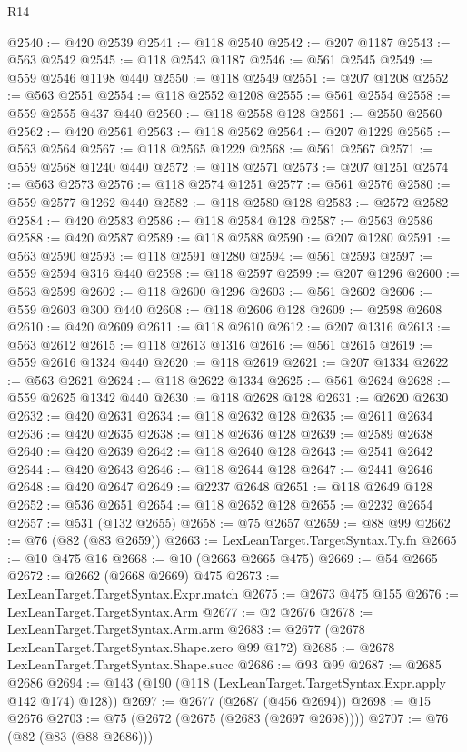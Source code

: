 \begin{lexlean}{R14}
\begin{coremodule}
@2540 := @420 @2539
@2541 := @118 @2540
@2542 := @207 @1187
@2543 := @563 @2542
@2545 := @118 @2543 @1187
@2546 := @561 @2545
@2549 := @559 @2546 @1198 @440
@2550 := @118 @2549
@2551 := @207 @1208
@2552 := @563 @2551
@2554 := @118 @2552 @1208
@2555 := @561 @2554
@2558 := @559 @2555 @437 @440
@2560 := @118 @2558 @128
@2561 := @2550 @2560
@2562 := @420 @2561
@2563 := @118 @2562
@2564 := @207 @1229
@2565 := @563 @2564
@2567 := @118 @2565 @1229
@2568 := @561 @2567
@2571 := @559 @2568 @1240 @440
@2572 := @118 @2571
@2573 := @207 @1251
@2574 := @563 @2573
@2576 := @118 @2574 @1251
@2577 := @561 @2576
@2580 := @559 @2577 @1262 @440
@2582 := @118 @2580 @128
@2583 := @2572 @2582
@2584 := @420 @2583
@2586 := @118 @2584 @128
@2587 := @2563 @2586
@2588 := @420 @2587
@2589 := @118 @2588
@2590 := @207 @1280
@2591 := @563 @2590
@2593 := @118 @2591 @1280
@2594 := @561 @2593
@2597 := @559 @2594 @316 @440
@2598 := @118 @2597
@2599 := @207 @1296
@2600 := @563 @2599
@2602 := @118 @2600 @1296
@2603 := @561 @2602
@2606 := @559 @2603 @300 @440
@2608 := @118 @2606 @128
@2609 := @2598 @2608
@2610 := @420 @2609
@2611 := @118 @2610
@2612 := @207 @1316
@2613 := @563 @2612
@2615 := @118 @2613 @1316
@2616 := @561 @2615
@2619 := @559 @2616 @1324 @440
@2620 := @118 @2619
@2621 := @207 @1334
@2622 := @563 @2621
@2624 := @118 @2622 @1334
@2625 := @561 @2624
@2628 := @559 @2625 @1342 @440
@2630 := @118 @2628 @128
@2631 := @2620 @2630
@2632 := @420 @2631
@2634 := @118 @2632 @128
@2635 := @2611 @2634
@2636 := @420 @2635
@2638 := @118 @2636 @128
@2639 := @2589 @2638
@2640 := @420 @2639
@2642 := @118 @2640 @128
@2643 := @2541 @2642
@2644 := @420 @2643
@2646 := @118 @2644 @128
@2647 := @2441 @2646
@2648 := @420 @2647
@2649 := @2237 @2648
@2651 := @118 @2649 @128
@2652 := @536 @2651
@2654 := @118 @2652 @128
@2655 := @2232 @2654
@2657 := @531 (@132 @2655)
@2658 := @75 @2657
@2659 := @88 @99
@2662 := @76 (@82 (@83 @2659))
@2663 := LexLeanTarget.TargetSyntax.Ty.fn
@2665 := @10 @475 @16
@2668 := @10 (@2663 @2665 @475)
@2669 := @54 @2665
@2672 := @2662 (@2668 @2669) @475
@2673 := LexLeanTarget.TargetSyntax.Expr.match
@2675 := @2673 @475 @155
@2676 := LexLeanTarget.TargetSyntax.Arm
@2677 := @2 @2676
@2678 := LexLeanTarget.TargetSyntax.Arm.arm
@2683 := @2677 (@2678 LexLeanTarget.TargetSyntax.Shape.zero @99 @172)
@2685 := @2678 LexLeanTarget.TargetSyntax.Shape.succ
@2686 := @93 @99
@2687 := @2685 @2686
@2694 := @143 (@190 (@118 (LexLeanTarget.TargetSyntax.Expr.apply @142 @174) @128))
@2697 := @2677 (@2687 (@456 @2694))
@2698 := @15 @2676
@2703 := @75 (@2672 (@2675 (@2683 (@2697 @2698))))
@2707 := @76 (@82 (@83 (@88 @2686)))

\end{coremodule}
\end{lexlean}
